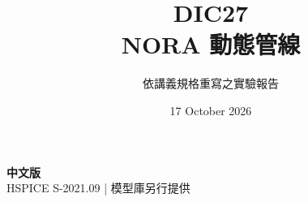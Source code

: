 \documentclass[11pt,a4paper]{article}
\title{\color{accent}DIC27\\[4pt]NORA 動態管線}
\author{依講義規格重寫之實驗報告}
\date{17 October 2026}
\begin{document}
\maketitle
\begin{center}\small\textbf{中文版}\\
HSPICE S-2021.09 \quad | \quad 模型庫另行提供
\end{center}


\end{document}
